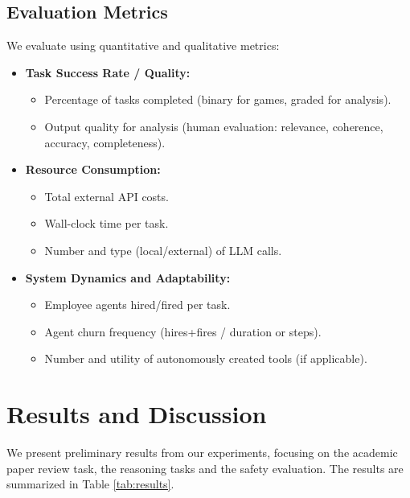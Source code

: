 \documentclass[conference]{IEEEtran}
\begin{document}
\subsection{Evaluation Metrics}
\label{subsec:metrics}
We evaluate using quantitative and qualitative metrics:
\begin{itemize}
    \item \textbf{Task Success Rate / Quality:}
        \begin{itemize}
            \item Percentage of tasks completed (binary for games, graded for analysis).
            \item Output quality for analysis (human evaluation: relevance, coherence, accuracy, completeness).
        \end{itemize}
    \item \textbf{Resource Consumption:}
        \begin{itemize}
            \item Total external API costs.
            \item Wall-clock time per task.
            \item Number and type (local/external) of LLM calls.
        \end{itemize}
    \item \textbf{System Dynamics and Adaptability:}
        \begin{itemize}
            \item Employee agents hired/fired per task.
            \item Agent churn frequency (hires+fires / duration or steps).
            \item Number and utility of autonomously created tools (if applicable).
        \end{itemize}
\end{itemize}

\section{Results and Discussion}
\label{sec:results}
We present preliminary results from our experiments, focusing on the academic paper review task, the reasoning tasks and the safety evaluation. The results are summarized in Table \ref{tab:results}.
\end{document}
